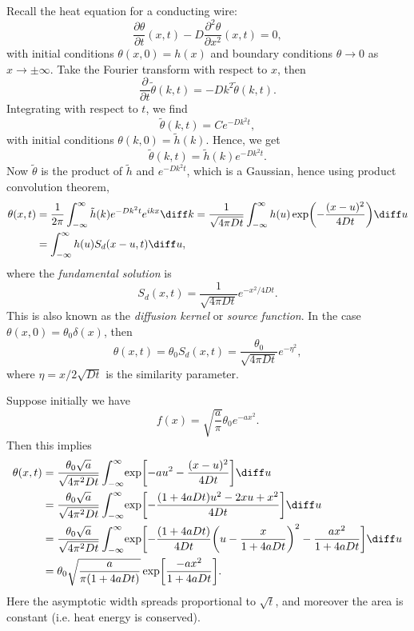 \documentclass[12pt]{article}
\begin{document}
Recall the heat equation for a conducting wire:
\[
	\frac{\partial \theta}{\partial t}(x, t) - D \frac{\partial^2 \theta}{\partial x^2}(x, t) = 0
,\]
with initial conditions $\theta(x, 0) = h(x)$ and boundary conditions $\theta \to 0$ as $x \to \pm \infty$. Take the Fourier transform with respect to $x$, then
\[
	\frac{\partial}{\partial t}\tilde \theta(k, t) = - D k^2 \tilde \theta (k, t)
.\]
Integrating with respect to $t$, we find
\[
	\tilde \theta(k, t) = C e^{-D k^2 t}
,\]
with initial conditions $\theta(k, 0) = \tilde h(k)$. Hence, we get
\[
	\tilde \theta(k, t) = \tilde h(k) e^{-D k^2 t}
.\]
Now $\tilde \theta$ is the product of $\tilde h$ and $e^{-Dk^2t}$, which is a Gaussian, hence using product convolution theorem,
\begin{align*}
	\theta(x, t) &= \frac{1}{2\pi} \int_{-\infty}^{\infty} \tilde h(k) e^{-D k^2 t} e^{ikx} \diff k = \frac{1}{\sqrt{4 \pi D t}} \int_{-\infty}^{\infty} h(u) \exp \biggl( - \frac{(x - u)^2}{4 D t} \biggr) \diff u \\
	&= \int_{-\infty}^{\infty}h(u) S_d(x - u, t) \diff u,
\end{align*}
where the \textit{fundamental solution} is
\[
	S_d(x, t) = \frac{1}{\sqrt{4 \pi D t}} e^{-x^2/4Dt}
.\]
This is also known as the \textit{diffusion kernel} or \textit{source function}. In the case $\theta(x, 0) = \theta_0 \delta(x)$, then
\[
	\theta(x, t) = \theta_0 S_d(x, t) = \frac{\theta_0}{\sqrt{4 \pi D t}} e^{- \eta^2}
,\]
where $\eta = x/2\sqrt{Dt}$ is the similarity parameter.

\begin{exbox}
	Suppose initially we have
	\[
		f(x) = \sqrt{\frac{a}{\pi}} \theta_0 e^{-ax^2}
	.\]
	Then this implies
	\begin{align*}
		\theta(x, t) &= \frac{\theta_0\sqrt a}{\sqrt{4 \pi^2 D t}} \int_{-\infty}^{\infty} \!\exp \biggl[ - au^2 - \frac{(x - u)^2}{4 D t} \biggr] \diff u \\
			     &= \frac{\theta_0 \sqrt a}{\sqrt{4 \pi^2 D t}} \int_{-\infty}^{\infty} \!\exp \biggl[ - \frac{(1 + 4 a D t)u^2 - 2 x u + x^2}{4 D t} \biggr] \diff u \\
			     &= \frac{\theta_0 \sqrt a}{\sqrt{4 \pi^2 D t}} \int_{-\infty}^{\infty} \!\exp \biggl[ - \frac{(1 + 4aDt)}{4Dt} \biggl(u - \frac{x}{1 + 4aDt} \biggr)^2-\frac{ax^2}{1 + 4 a D t} \biggr] \diff u \\
			     &= \theta_0 \sqrt{\frac{a}{\pi(1 + 4aDt)}} \exp \biggl[ \frac{-ax^2}{1 + 4aDt}\biggr].
	\end{align*}
	Here the asymptotic width spreads proportional to $\sqrt t$, and moreover the area is constant (i.e. heat energy is conserved).
\end{exbox}
\end{document}
